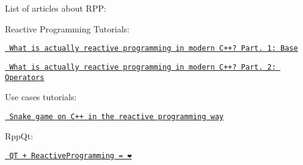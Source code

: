 \label{md_docs_2_articles_autotoc_md5}%
%
 List of articles about RPP\+:

Reactive Programming Tutorials\+:
\begin{DoxyItemize}
\item \href{https://medium.com/@victimsnino/what-is-actually-reactive-programming-in-modern-c-part-1-base-929355ac2901?source=friends_link&sk=59986e68b0688469c65ca0c757bbfd89}{\texttt{ What is actually reactive programming in modern C++? Part. 1\+: Base}}
\item \href{https://itnext.io/what-is-actually-reactive-programming-in-modern-c-part-2-operators-63d5ea7223cc?source=friends_link&sk=73cc7b8928d2944569e07f402d43d123}{\texttt{ What is actually reactive programming in modern C++? Part. 2\+: Operators}}
\end{DoxyItemize}

Use cases tutorials\+:
\begin{DoxyItemize}
\item \href{https://medium.com/@victimsnino/snake-game-on-c-in-the-reactive-programming-way-19310a73923a?source=friends_link&sk=608039f66da373d4f81c806ffe58298c}{\texttt{ Snake game on C++ in the reactive programming way}}
\end{DoxyItemize}

Rpp\+Qt\+:
\begin{DoxyItemize}
\item \href{https://itnext.io/qt-reactiveprogramming-1ba0106c17d8?source=friends_link&sk=59c3cb817d56996094b640aeba629bd0}{\texttt{ QT + Reactive\+Programming = ❤}} 
\end{DoxyItemize}